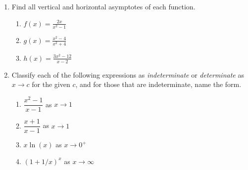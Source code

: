 \begin{enumerate}
\item Find all vertical and horizontal asymptotes of each function.
      \begin{enumerate}
        \item $\displaystyle f(x) = \frac{2x}{x^2 - 1}$
        \item $\displaystyle g(x) = \frac{x^2 - 4}{x^2 + 4}$
        \item $\displaystyle h(x) = \frac{3x^2 - 12}{x - 2}$
      \end{enumerate}

\item Classify each of the following expressions as
      \emph{indeterminate} or \emph{determinate} as $x \to c$
      for the given $c$, and for those that are indeterminate,
      name the form.
      \begin{enumerate}
        \item $\dfrac{x^2 - 1}{x - 1}$ as $x \to 1$
        \item $\dfrac{x + 1}{x - 1}$ as $x \to 1$
        \item $x \ln(x)$ as $x \to 0^+$
        \item $(1 + 1/x)^x$ as $x \to \infty$
      \end{enumerate}

\end{enumerate}